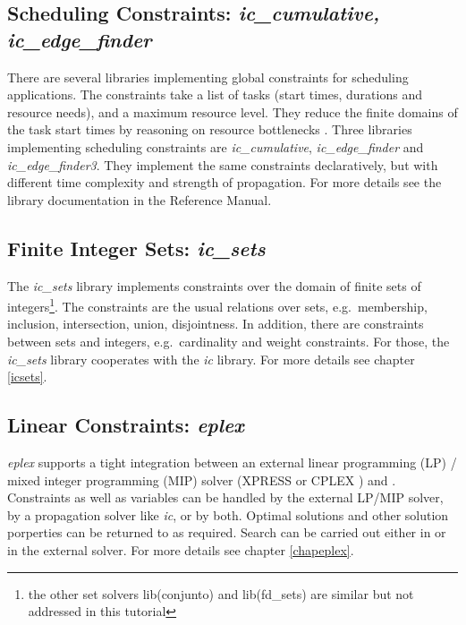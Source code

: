 \subsection{Scheduling Constraints: {\em ic_cumulative, ic_edge_finder}}
\label{shortsecsched}
There are several { \eclipse } libraries implementing global constraints for
scheduling applications.
The constraints take a list
of tasks (start times, durations and resource needs), and a maximum
resource level. They reduce the finite domains of the task start times
by reasoning on resource bottlenecks \cite{lepape}.  Three { \eclipse } libraries
implementing scheduling constraints are
{\em ic_cumulative}, {\em ic_edge\_finder} and {\em ic_edge\_finder3}.
They implement the same constraints declaratively, but with
different time complexity and strength of propagation.
For more details see the library documentation in the Reference Manual.



\subsection{Finite Integer Sets: {\em ic_sets}}
\label{shortsecsets}
The {\em ic_sets} library
implements constraints over the domain of finite
sets of integers\footnote{
the other set solvers lib(conjunto) and lib(fd_sets) are similar but not
addressed in this tutorial}.
The constraints are the usual relations over sets,
e.g.\ membership, inclusion, intersection, union, disjointness.
In addition, there are constraints between sets and integers, e.g.\
cardinality and weight constraints. For those, the {\em ic_sets} library
cooperates with the {\em ic} library.
For more details see chapter \ref{icsets}.




\subsection{Linear Constraints: {\em eplex}}
\label{shortseceplex}
{\em eplex} supports a tight integration \cite{Bockmayr} between an
external linear programming (LP) / mixed integer programming (MIP)
solver (XPRESS \cite{Dash} or CPLEX \cite{ILOG}) and { \eclipse }. 
Constraints as well as variables can be handled by the external LP/MIP
solver, by a propagation solver like {\em ic}, or by both.
Optimal solutions and other solution porperties can be returned to
\eclipse{} as required.
Search can be carried out either in \eclipse{} or in the external solver.
For more details see chapter \ref{chapeplex}.



